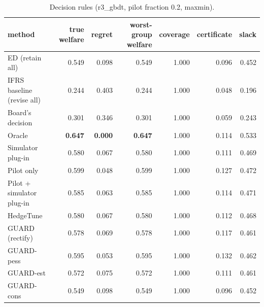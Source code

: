 \begin{table}[t]
\centering
\small
\begin{tabular}{lrrrrrr}
\toprule
method & true welfare & regret & worst-group welfare & coverage & certificate & slack \\
\midrule
ED (retain all) & 0.549 & 0.098 & 0.549 & 1.000 & 0.096 & 0.452 \\
IFRS baseline (revise all) & 0.244 & 0.403 & 0.244 & 1.000 & 0.048 & 0.196 \\
Board's decision & 0.301 & 0.346 & 0.301 & 1.000 & 0.059 & 0.243 \\
Oracle & \textbf{0.647} & \textbf{0.000} & \textbf{0.647} & 1.000 & 0.114 & 0.533 \\
Simulator plug-in & 0.580 & 0.067 & 0.580 & 1.000 & 0.111 & 0.469 \\
Pilot only & 0.599 & 0.048 & 0.599 & 1.000 & 0.127 & 0.472 \\
Pilot + simulator plug-in & 0.585 & 0.063 & 0.585 & 1.000 & 0.114 & 0.471 \\
HedgeTune & 0.580 & 0.067 & 0.580 & 1.000 & 0.112 & 0.468 \\
GUARD (rectify) & 0.578 & 0.069 & 0.578 & 1.000 & 0.117 & 0.461 \\
GUARD-pess & 0.595 & 0.053 & 0.595 & 1.000 & 0.132 & 0.462 \\
GUARD-est & 0.572 & 0.075 & 0.572 & 1.000 & 0.111 & 0.461 \\
GUARD-cons & 0.549 & 0.098 & 0.549 & 1.000 & 0.096 & 0.452 \\
\bottomrule
\end{tabular}
\caption{Decision rules (r3\_gbdt, pilot fraction 0.2, maxmin).}
\label{tab:methods-maxmin}
\end{table}
